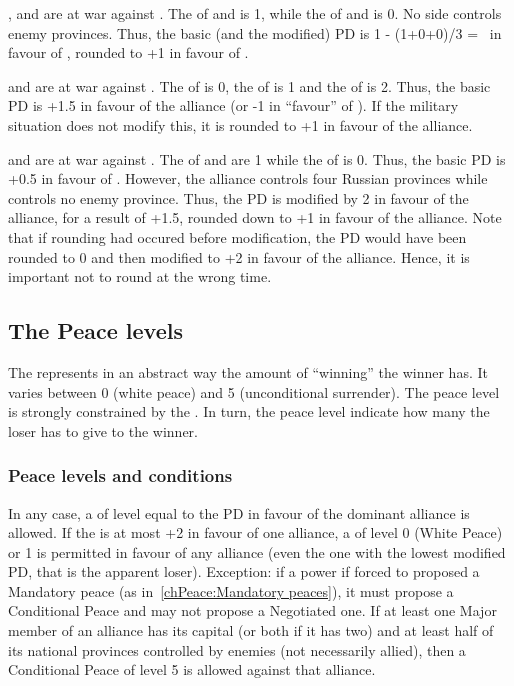 \begin{exemple}[Rounding PD]
  \SUE, \POL and \TUR are at war against \RUS. The \STAB of \RUS and \SUE is
  1, while the \STAB of \POL and \TUR is 0. No side controls enemy
  provinces. Thus, the basic (and the modified) PD is 1 - (1+0+0)/3 = \td\ in
  favour of \RUS, rounded to +1 in favour of \RUS.
  
  \smallskip

  \SUE and \TUR are at war against \RUS. The \STAB of \RUS is 0, the \STAB of
  \TUR is 1 and the \STAB of \SUE is 2. Thus, the basic PD is +1.5 in favour
  of the alliance (or -1 in ``favour'' of \RUS). If the military situation
  does not modify this, it is rounded to +1 in favour of the alliance.

  \smallskip

  \SUE and \TUR are at war against \RUS. The \STAB of \RUS and \TUR are 1
  while the \STAB of \SUE is 0. Thus, the basic PD is +0.5 in favour of
  \RUS. However, the alliance controls four Russian provinces while \RUS
  controls no enemy province. Thus, the PD is modified by 2 in favour of the
  alliance, for a result of +1.5, rounded down to +1 in favour of the
  alliance. Note that if rounding had occured before modification, the PD
  would have been rounded to 0 and then modified to +2 in favour of the
  alliance. Hence, it is important not to round at the wrong time.
\end{exemple}

\subsection{The Peace levels}
The  represents in an abstract way the amount of
``winning'' the winner has. It varies between 0 (white peace) and 5
(unconditional surrender). The peace level is strongly constrained by the
. In turn, the peace level indicate how many
 the loser has to give to the winner.

\subsubsection{Peace levels and conditions}
\bparag In any case, a  of level equal to the PD in
favour of the dominant alliance is
allowed. %
\bparag If the  is at most +2 in favour of one
alliance, a  of level 0 (White Peace) or 1 is
permitted in favour of any alliance (even the one with the lowest modified PD,
that is the apparent loser).
\bparag Exception: if a power if forced to proposed a Mandatory peace (as
in~\ref{chPeace:Mandatory peaces}), it must propose a Conditional Peace and
may not propose a Negotiated one.
\bparag If at least one Major member of an alliance has its capital (or both
if it has two) and at least half of its national provinces controlled by
enemies (not necessarily allied), then a Conditional Peace of level 5 is
allowed against that alliance.


